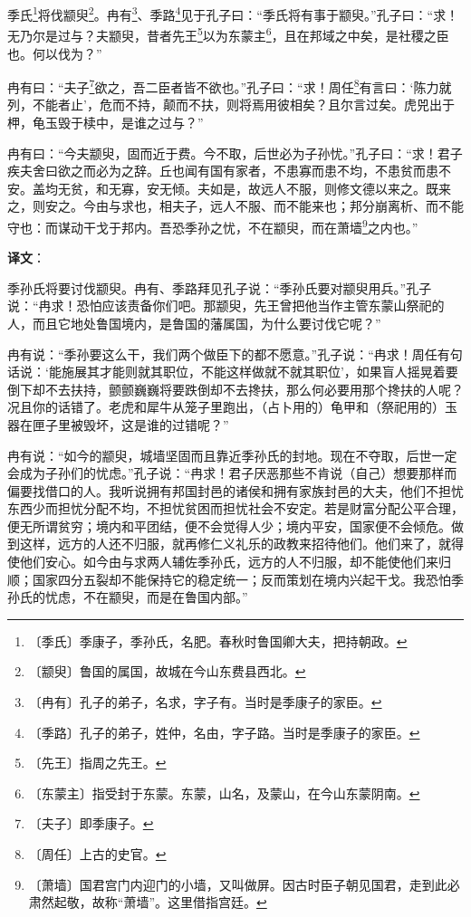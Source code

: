\documentclass[12pt,UTF-8,openany]{ctexbook}
\begin{document}
\begin{normalsize}
    
    季氏\footnote{〔季氏〕季康子，季孙氏，名肥。春秋时鲁国卿大夫，把持朝政。}将伐颛臾\footnote{〔颛臾〕鲁国的属国，故城在今山东费县西北。}。冉有\footnote{〔冉有〕孔子的弟子，名求，字子有。当时是季康子的家臣。}、季路\footnote{〔季路〕孔子的弟子，姓仲，名由，字子路。当时是季康子的家臣。}见于孔子曰：“季氏将有事于颛臾。”孔子曰：“求！无乃尔是过与？夫颛臾，昔者先王\footnote{〔先王〕指周之先王。}以为东蒙主\footnote{〔东蒙主〕指受封于东蒙。东蒙，山名，及蒙山，在今山东蒙阴南。}，且在邦域之中矣，是社稷之臣也。何以伐为？”
    
    冉有曰：“夫子\footnote{〔夫子〕即季康子。}欲之，吾二臣者皆不欲也。”孔子曰：“求！周任\footnote{〔周任〕上古的史官。}有言曰：‘陈力就列，不能者止’，危而不持，颠而不扶，则将焉用彼相矣？且尔言过矣。虎兕出于柙，龟玉毁于椟中，是谁之过与？”
    
    冉有曰：“今夫颛臾，固而近于费。今不取，后世必为子孙忧。”孔子曰：“求！君子疾夫舍曰欲之而必为之辞。丘也闻有国有家者，不患寡而患不均，不患贫而患不安。盖均无贫，和无寡，安无倾。夫如是，故远人不服，则修文德以来之。既来之，则安之。今由与求也，相夫子，远人不服、而不能来也；邦分崩离析、而不能守也：而谋动干戈于邦内。吾恐季孙之忧，不在颛臾，而在萧墙\footnote{〔萧墙〕国君宫门内迎门的小墙，又叫做屏。因古时臣子朝见国君，走到此必肃然起敬，故称“萧墙”。这里借指宫廷。}之内也。”
\end{normalsize}


\newpage

\textbf{译文}：

\vspace{1em}

\begin{normalsize}
    
    季孙氏将要讨伐颛臾。冉有、季路拜见孔子说：“季孙氏要对颛臾用兵。”孔子说：“冉求！恐怕应该责备你们吧。那颛臾，先王曾把他当作主管东蒙山祭祀的人，而且它地处鲁国境内，是鲁国的藩属国，为什么要讨伐它呢？”
    
    冉有说：“季孙要这么干，我们两个做臣下的都不愿意。”孔子说：“冉求！周任有句话说：‘能施展其才能则就其职位，不能这样做就不就其职位’，如果盲人摇晃着要倒下却不去扶持，颤颤巍巍将要跌倒却不去搀扶，那么何必要用那个搀扶的人呢？况且你的话错了。老虎和犀牛从笼子里跑出，（占卜用的）龟甲和（祭祀用的）玉器在匣子里被毁坏，这是谁的过错呢？”
    
    冉有说：“如今的颛臾，城墙坚固而且靠近季孙氏的封地。现在不夺取，后世一定会成为子孙们的忧虑。”孔子说：“冉求！君子厌恶那些不肯说（自己）想要那样而偏要找借口的人。我听说拥有邦国封邑的诸侯和拥有家族封邑的大夫，他们不担忧东西少而担忧分配不均，不担忧贫困而担忧社会不安定。若是财富分配公平合理，便无所谓贫穷；境内和平团结，便不会觉得人少；境内平安，国家便不会倾危。做到这样，远方的人还不归服，就再修仁义礼乐的政教来招待他们。他们来了，就得使他们安心。如今由与求两人辅佐季孙氏，远方的人不归服，却不能使他们来归顺；国家四分五裂却不能保持它的稳定统一；反而策划在境内兴起干戈。我恐怕季孙氏的忧虑，不在颛臾，而是在鲁国内部。”
    
\end{normalsize}
\end{document}
